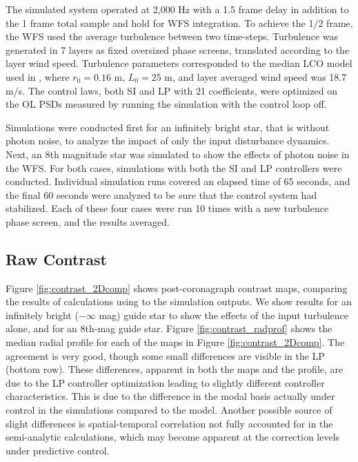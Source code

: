 \documentclass[10pt,preprint]{aastex631}
\begin{document}
The simulated system operated at 2,000 Hz with a 1.5 frame delay in addition to the 1 frame total sample and hold for WFS integration.  To achieve the 1/2 frame, the WFS used the average turbulence between two time-steps.  Turbulence was generated in 7 layers as fixed oversized phase screens, translated according to the layer wind speed.   Turbulence parameters corresponded to the median LCO model used in \citet{2018JATIS...4a9001M}, where $r_0 = 0.16$ m, $L_0 = 25$ m, and layer averaged wind speed was 18.7 m/s.  The control laws, both SI and LP with 21 coefficients, were optimized on the OL PSDs measured by running the simulation with the control loop off.

Simulations were conducted first for an infinitely bright star, that is without photon noise, to analyze the impact of only the input disturbance dynamics.  Next, an 8th magnitude star was simulated to show the effects of photon noise in the WFS.  For both cases, simulations with both the SI and LP controllers were conducted.  Individual simulation runs covered an elapsed time of 65 seconds, and the final 60 seconds were analyzed to be sure that the control system had stabilized.  Each of these four cases were run 10 times with a new turbulence phase screen, and the results averaged.

\subsection{Raw Contrast}
Figure \ref{fig:contrast_2Dcomp} shows post-coronagraph contrast maps, comparing the results of calculations using \citet{2018JATIS...4a9001M} to the simulation outputs.  We show results for an infinitely bright ($-\infty$ mag) guide star to show the effects of the input turbulence alone, and for an $8$th-mag guide star.   Figure \ref{fig:contrast_radprof} shows the median radial profile for each of the maps in Figure \ref{fig:contrast_2Dcomp}.  The agreement is very good, though some small differences are visible in the LP (bottom row). These differences, apparent in both the maps and the profile, are due to the LP controller optimization leading to slightly different controller characteristics.  This is due to the difference in the modal basis actually under control in the simulations compared to the model. Another possible source of slight differences is spatial-temporal correlation not fully accounted for in the semi-analytic calculations, which may become apparent at the correction levels under predictive control.
\end{document}
